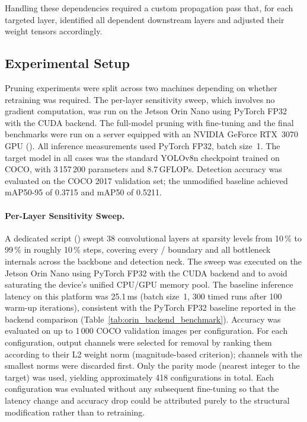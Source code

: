 \documentclass[12pt,a4paper]{report}
\begin{document}
Handling these dependencies required a custom propagation pass that, for each targeted layer,
identified all dependent downstream layers and adjusted their weight tensors accordingly.

\subsection{Experimental Setup}

Pruning experiments were split across two machines depending on whether retraining was
required. The per-layer sensitivity sweep, which involves no gradient computation, was run
on the Jetson Orin Nano using PyTorch FP32 with the CUDA backend. The full-model pruning
with fine-tuning and the final benchmarks were run on a server equipped with an
NVIDIA GeForce RTX~3070 GPU (). All inference measurements used PyTorch FP32,
batch size~1. The target model in all cases was the standard YOLOv8n checkpoint trained on
COCO, with 3\,157\,200 parameters and 8.7\,GFLOPs. Detection accuracy was evaluated on the
COCO 2017 validation set; the unmodified baseline achieved mAP50-95 of 0.3715 and mAP50
of 0.5211.

\paragraph{Per-Layer Sensitivity Sweep.}
A dedicated script () swept 38 convolutional layers
at sparsity levels from 10\,\% to 99\,\% in roughly 10\,\% steps, covering every
/ boundary and all bottleneck internals across the backbone and
detection neck. The sweep was executed on the Jetson Orin Nano using PyTorch FP32 with
the CUDA backend and  to avoid saturating the device's unified CPU/GPU
memory pool. The baseline inference latency on this platform was 25.1\,ms (batch size~1,
300 timed runs after 100 warm-up iterations), consistent with the PyTorch FP32 baseline
reported in the backend comparison (Table~\ref{tab:orin_backend_benchmark}).
Accuracy was evaluated on up to 1\,000 COCO validation images per configuration.
For each configuration, output channels were selected for removal by ranking them according
to their L2 weight norm (magnitude-based criterion); channels with the smallest norms were
discarded first. Only the  parity mode (nearest integer to the target) was used,
yielding approximately 418 configurations in total. Each configuration was evaluated without
any subsequent fine-tuning so that the latency change and accuracy drop could be attributed
purely to the structural modification rather than to retraining.
\end{document}
